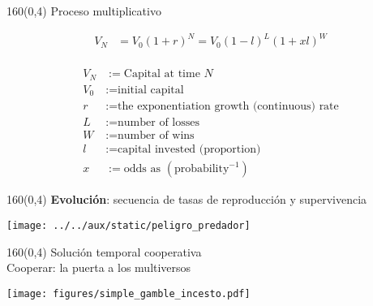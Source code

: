 \documentclass[shownotes,aspectratio=169]{beamer}
\begin{document}
\begin{frame}[plain]
 \begin{textblock}{160}(0,4)
  \centering \Large Proceso multiplicativo
 \end{textblock}
 \vspace{1cm}
 
 
\begin{align*}
 V_N & = V_0 (1+r)^N = V_0 (1-l)^L (1+xl)^W \\
\end{align*}

\vspace{-1cm}
 \begin{align*}
V_N & := \text{Capital at time } N \\
V_0 & := \text{initial capital} \\
r & := \text{the exponentiation growth (continuous) rate} \\
L &:= \text{number of losses} \\
W &:= \text{number of wins} \\
l & := \text{capital invested (proportion)} \\
x & := \text{odds as } (\text{probability}^{-1})
\end{align*} 
 
\end{frame}



\begin{frame}[plain]
 \begin{textblock}{160}(0,4)
  \centering \Large \textbf{Evoluci\'on}: secuencia de tasas de reproducción y supervivencia 
 \end{textblock}
\vspace{1.33cm}
 
 \centering
 \texttt{[image: ../../aux/static/peligro\_predador]}

 
\end{frame}

\begin{frame}[plain]
 \begin{textblock}{160}(0,4)
  \centering \Large Solución temporal cooperativa \\ \normalsize Cooperar: la puerta a los multiversos
 \end{textblock}
 
 \centering
\vspace{1cm}
 
\texttt{[image: figures/simple\_gamble\_incesto.pdf]}

\end{frame}
\end{document}
